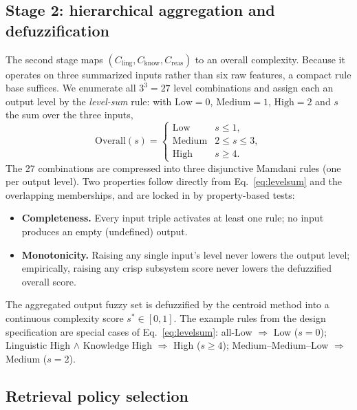 \documentclass[11pt]{article}
\begin{document}
\subsection{Stage 2: hierarchical aggregation and defuzzification}
\label{sec:hierarchical}

The second stage maps $(C_{\mathrm{ling}}, C_{\mathrm{know}},
C_{\mathrm{reas}})$ to an overall complexity. Because it operates on three
summarized inputs rather than six raw features, a compact rule base suffices.
We enumerate all $3^3 = 27$ level combinations and assign each an output level
by the \emph{level-sum} rule: with $\mathrm{Low}{=}0$, $\mathrm{Medium}{=}1$,
$\mathrm{High}{=}2$ and $s$ the sum over the three inputs,
\begin{equation}
\mathrm{Overall}(s) =
\begin{cases}
\mathrm{Low} & s \le 1,\\
\mathrm{Medium} & 2 \le s \le 3,\\
\mathrm{High} & s \ge 4.
\end{cases}
\label{eq:levelsum}
\end{equation}
The 27 combinations are compressed into three disjunctive Mamdani rules (one
per output level). Two properties follow directly from
Eq.~\eqref{eq:levelsum} and the overlapping memberships, and are locked in by
property-based tests:

\begin{itemize}
  \item \textbf{Completeness.} Every input triple activates at least one rule;
        no input produces an empty (undefined) output.
  \item \textbf{Monotonicity.} Raising any single input's level never lowers
        the output level; empirically, raising any crisp subsystem score never
        lowers the defuzzified overall score.
\end{itemize}

The aggregated output fuzzy set is defuzzified by the centroid method into a
continuous complexity score $s^\ast \in [0,1]$. The example rules from the
design specification are special cases of Eq.~\eqref{eq:levelsum}: all-Low
$\Rightarrow$ Low ($s{=}0$); Linguistic High $\wedge$ Knowledge High
$\Rightarrow$ High ($s \ge 4$); Medium--Medium--Low $\Rightarrow$ Medium
($s{=}2$).

\subsection{Retrieval policy selection}
\label{sec:policy}
\end{document}
